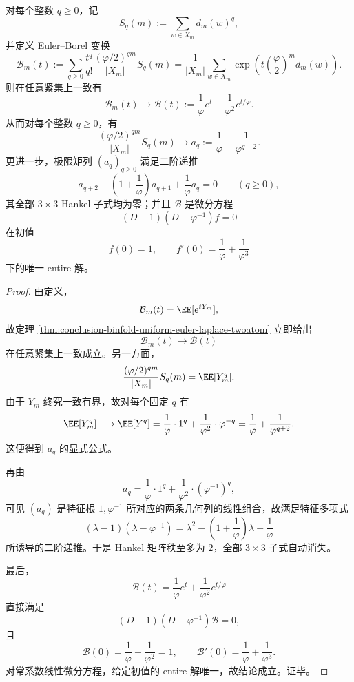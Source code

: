 \begin{theorem}\label{thm:conclusion-binfold-euler-borel-ranktwo-collapse}
对每个整数 \(q\ge 0\)，记
\[
S_q(m):=\sum_{w\in X_m} d_m(w)^q,
\]
并定义 Euler--Borel 变换
\[
\mathcal B_m(t)
:=
\sum_{q\ge 0}\frac{t^q}{q!}
\frac{(\varphi/2)^{qm}}{|X_m|}S_q(m)
=
\frac{1}{|X_m|}
\sum_{w\in X_m}
\exp\!\left(
t\left(\frac{\varphi}{2}\right)^m d_m(w)
\right).
\]
则在任意紧集上一致有
\[
\mathcal B_m(t)\longrightarrow
\mathcal B(t):=
\frac{1}{\varphi}e^t+\frac{1}{\varphi^2}e^{t/\varphi}.
\]
从而对每个整数 \(q\ge 0\)，有
\[
\frac{(\varphi/2)^{qm}}{|X_m|}S_q(m)\longrightarrow
a_q:=\frac{1}{\varphi}+\frac{1}{\varphi^{q+2}}.
\]
更进一步，极限矩列 \((a_q)_{q\ge 0}\) 满足二阶递推
\[
a_{q+2}
-
\left(1+\frac{1}{\varphi}\right)a_{q+1}
+
\frac{1}{\varphi}a_q
=0
\qquad(q\ge 0),
\]
其全部 \(3\times 3\) Hankel 子式均为零；并且 \(\mathcal B\) 是微分方程
\[
(D-1)(D-\varphi^{-1})f=0
\]
在初值
\[
f(0)=1,
\qquad
f'(0)=\frac{1}{\varphi}+\frac{1}{\varphi^3}
\]
下的唯一 entire 解。
\end{theorem}
\begin{proof}
由定义，
\[
\mathcal B_m(t)=\EE[e^{tY_m}],
\]
故定理 \ref{thm:conclusion-binfold-uniform-euler-laplace-twoatom} 立即给出
\[
\mathcal B_m(t)\longrightarrow \mathcal B(t)
\]
在任意紧集上一致成立。另一方面，
\[
\frac{(\varphi/2)^{qm}}{|X_m|}S_q(m)=\EE[Y_m^q].
\]
由于 \(Y_m\) 终究一致有界，故对每个固定 \(q\) 有
\[
\EE[Y_m^q]\longrightarrow \EE[Y^q]
=
\frac{1}{\varphi}\cdot 1^q+\frac{1}{\varphi^2}\cdot \varphi^{-q}
=
\frac{1}{\varphi}+\frac{1}{\varphi^{q+2}}.
\]
这便得到 \(a_q\) 的显式公式。

再由
\[
a_q=
\frac{1}{\varphi}\cdot 1^q+\frac{1}{\varphi^2}\cdot (\varphi^{-1})^q,
\]
可见 \((a_q)\) 是特征根 \(1,\varphi^{-1}\) 所对应的两条几何列的线性组合，故满足特征多项式
\[
(\lambda-1)(\lambda-\varphi^{-1})
=
\lambda^2-\left(1+\frac{1}{\varphi}\right)\lambda+\frac{1}{\varphi}
\]
所诱导的二阶递推。于是 Hankel 矩阵秩至多为 \(2\)，全部 \(3\times 3\) 子式自动消失。

最后，
\[
\mathcal B(t)=\frac{1}{\varphi}e^t+\frac{1}{\varphi^2}e^{t/\varphi}
\]
直接满足
\[
(D-1)(D-\varphi^{-1})\mathcal B=0,
\]
且
\[
\mathcal B(0)=\frac{1}{\varphi}+\frac{1}{\varphi^2}=1,
\qquad
\mathcal B'(0)=\frac{1}{\varphi}+\frac{1}{\varphi^3}.
\]
对常系数线性微分方程，给定初值的 entire 解唯一，故结论成立。证毕。
\end{proof}

